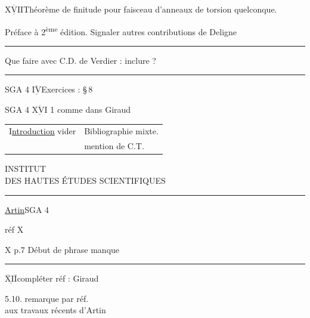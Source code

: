 $\underline{\overline{\mathrm{XVII}}}$\qquad Théorème de finitude pour faisceau d'anneaux de torsion quelconque.

Préface à 2\textsuperscript{ème} édition. Signaler autres contributions de Deligne

\noindent\rule{\linewidth}{0.4pt}

Que faire avec C.D. de Verdier : inclure ?

\noindent\rule{\linewidth}{0.4pt}

SGA 4 $\underline{\overline{\mathrm{IV}}}$\qquad Exercices   : \S\,8

SGA 4 $\underline{\overline{\mathrm{XVI}}}$ 1\qquad {} comme dans Giraud

\noindent\begin{tabular}{@{}l|l@{}}
I\uline{ntroduction} vider & Bibliographie mixte.\\
 & mention de C.T.
\end{tabular}

\begin{center}
INSTITUT\\
DES HAUTES ÉTUDES SCIENTIFIQUES\\
\rule{2.3em}{0.4pt}
\end{center}

\uline{Artin}\qquad SGA 4

réf \quad X \quad [1]

X \qquad p.7 \qquad Début de phrase manque

\noindent\rule{\linewidth}{0.4pt}

$\underline{\overline{\mathrm{X}}\mathrm{I}\overline{\mathrm{I}}}$\qquad compléter réf : Giraud

5.10. \qquad {} remarque par réf.\\
\hspace*{5em}aux travaux récents d'Artin


